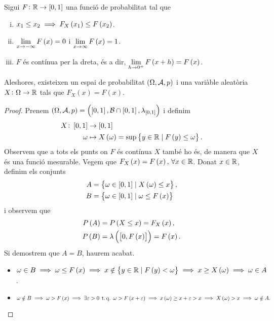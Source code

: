 \begin{teo}
  Sigui $F\colon \mathbb{R} \to [0,1]$ una funció de probabilitat tal que
  \begin{enumerate}[i)]
       \item $x_1\leq x_2\implies F_X\left( x_1\right) \leq F\left( x_2\right)$.
       \item $\lim\limits_{x\to-\infty}F\left( x\right) = 0$ i $\lim\limits_{x\to\infty}F\left( x\right) = 1$.
       \item $F$ és contínua per la dreta, és a dir, $\lim\limits_{h\to 0^+}F\left( x+h\right) = F\left( x\right)$.
   \end{enumerate}
   Aleshores, existeixen un espai de probabilitat $\left( \Omega,\mathcal{A},p\right)$ i una variàble aleatòria $X\colon\Omega\to\mathbb{R}$ tals que $F_X(x)=F(x)$.
\end{teo}
\begin{proof}
    Prenem $\left(\Omega,\mathcal{A},p\right)=\left(\left[ 0,1\right],\mathcal{B}\cap\left[ 0,1\right],\lambda_{\left[ 0,1\right]}\right)$ i definim
    \begin{align*}
        X\colon\left[ 0,1\right] &\to\left[ 0,1\right]\\
        \omega &\mapsto X\left(\omega\right)=\sup\left\{ y\in\mathbb{R}\mid F\left( y\right)\leq\omega\right\}.
    \end{align*}
    Observem que a tots els punts on $F$ és contínua $X$ també ho és, de manera que $X$ és una funció mesurable. Vegem que $F_X\left( x\right)=F\left( x\right),\,\forall x\in\mathbb{R}$. Donat $x\in\mathbb{R}$, definim els conjunts
    \begin{align*}
        A&=\left\{\omega\in\left[ 0,1\right]\mid X\left(\omega\right)\leq x\right\},\\
        B&=\left\{\omega\in\left[ 0,1\right]\mid \omega\leq F\left( x\right)\right\}
    \end{align*}
    i observem que
    \begin{align*}
        P\left( A\right)&=P\left( X\leq x\right) = F_X\left( x\right),\\
        P\left( B\right)&=\lambda\left(\left[ 0,F\left( x\right)\right]\right)=F\left( x\right).\\
    \end{align*}
    Si demostrem que $A=B$, haurem acabat.
    \begin{itemize}
        \item $\omega\in B\implies\omega\leq F\left( x\right)\implies x\notin\left\{ y\in\mathbb{R}\mid F\left( y\right)<\omega\right\}\implies x\geq X\left(\omega\right)\implies\omega\in A$.
        \item $\omega\notin B\implies\omega>F\left( x\right)\implies\exists\varepsilon>0\operatorname{\;t.q.\;}\omega>F\left( x+\varepsilon\right)\implies x\left(\omega\right)\geq x+\varepsilon>x\implies X\left(\omega\right)>x\implies\omega\notin A.$
    \end{itemize}
    
\end{proof}

